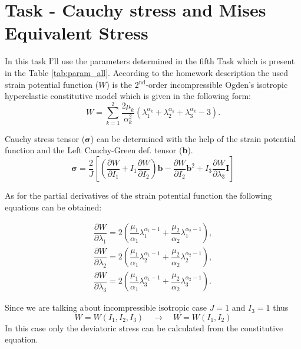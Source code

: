 \documentclass[12pt]{article}
\begin{document}
\section{Task - Cauchy stress and Mises Equivalent Stress}
In this task I'll use the parameters determined in the fifth Task which is present in the Table \ref{tab:param_all}. According to the homework description the used strain potential function ($W$) is the 2$^{\text{nd}}$-order incompressible Ogden's isotropic hyperelastic constitutive model which is given in the following form:
\begin{equation}
  W = \sum_{k = 1}^{2} \dfrac{2 \mu_k}{\alpha_k^2} \left( \lambda_1^{\alpha_k} + \lambda_2^{\alpha_k} + \lambda_3^{\alpha_k} - 3 \right).
\end{equation}

\noindent Cauchy stress tensor ($\bm{\sigma}$) can be determined with the help of the strain potential function and the Left Cauchy-Green def. tensor (\textbf{b}).
\begin{equation}
  \bm{\sigma} = \dfrac{2}{J} \left[ \left( \dfrac{\partial W}{\partial I_1} + I_1 \dfrac{\partial W}{\partial I_2} \right) \textbf{b} - \dfrac{\partial W}{\partial I_2} \textbf{b}^2 + I_3 \dfrac{\partial W}{\partial \lambda_3} \textbf{I} \right]
\end{equation}

\noindent As for the partial derivatives of the strain potential function the following equations can be obtained:

\begin{gather}
  \dfrac{\partial W}{\partial \lambda_1} = 2 \left( \dfrac{\mu_1}{\alpha_1} \lambda_1 ^{\alpha_1-1} + \dfrac{\mu_2}{\alpha_2} \lambda_1^{\alpha_2 - 1} \right), \\
  \dfrac{\partial W}{\partial \lambda_2} = 2 \left( \dfrac{\mu_1}{\alpha_1} \lambda_2 ^{\alpha_1-1} + \dfrac{\mu_2}{\alpha_2} \lambda_2^{\alpha_2 - 1} \right), \\
  \dfrac{\partial W}{\partial \lambda_3} = 2 \left( \dfrac{\mu_1}{\alpha_1} \lambda_3 ^{\alpha_1-1} + \dfrac{\mu_2}{\alpha_2} \lambda_3^{\alpha_2 - 1} \right).
\end{gather}

\noindent Since we are talking about incompressible isotropic case $J = 1$ and $I_3 = 1$ thus
\begin{equation}
  W = W \left( I_1, I_2, I_3 \right) \quad \rightarrow \quad W = W \left(I_1, I_2 \right)
\end{equation}
In this case only the deviatoric stress can be calculated from the constitutive equation.
\end{document}
